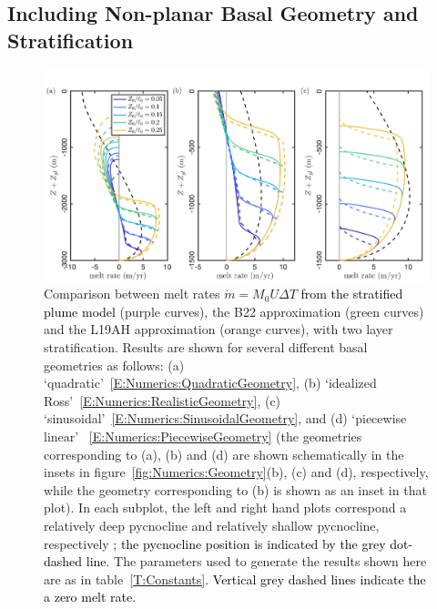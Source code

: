 \documentclass[openacc]{rsproca_new}%
\newcommand{\red}[1]{{\color{red} #1}}
\newcommand{\blue}[1]{{\color{blue} #1}}
\newcommand{\rout}[1]{\red{\st{#1}}}\newcommand{\ab}[1]{\textcolor{Green}{#1}}\newcommand{\about}[1]{\textcolor{Cyan}{\sout{#1}}}
\renewcommand{\rout}[1]{{}} %
\renewcommand{\blue}[1]{{\textcolor{black}{#1}}} %
\renewcommand{\red}[1]{{}} %
\begin{document}
\subsection{Including Non-planar Basal Geometry and Stratification}
\begin{figure}
\centering
\includegraphics[width = \textwidth]{./make_plots/plots/figure7.png}
\caption{Comparison between \rout{numerically obtained }melt rates $\dot{m}= M_0 U \Delta T$ \blue{from the stratified plume model} (purple curves), the B22 approximation (green curves) and the L19AH approximation (orange curves), with two layer stratification. Results are shown for several different basal geometries as follows: (a) `quadratic'~\eqref{E:Numerics:QuadraticGeometry}, (b) `idealized Ross'~\eqref{E:Numerics:RealisticGeometry}, (c) `sinusoidal'~\eqref{E:Numerics:SinusoidalGeometry}, and (d) `piecewise linear' ~\eqref{E:Numerics:PiecewiseGeometry} (the geometries corresponding to (a), (b) and (d) are shown schematically in the insets in figure~\ref{fig:Numerics:Geometry}(b), (c) and (d), respectively, while the geometry corresponding to (b) is shown as an inset in that plot). In each subplot, the left and right hand plots correspond a relatively deep pycnocline and relatively shallow pycnocline, respectively \blue{; the pycnocline position is indicated by the grey dot-dashed line}. The parameters used to generate the results shown here are as in table~\ref{T:Constants}. \blue{Vertical grey dashed lines indicate the a zero melt rate.} }\label{fig:Numerics:pycnocline_and_geometry_idealized}
\end{figure}
\end{document}
